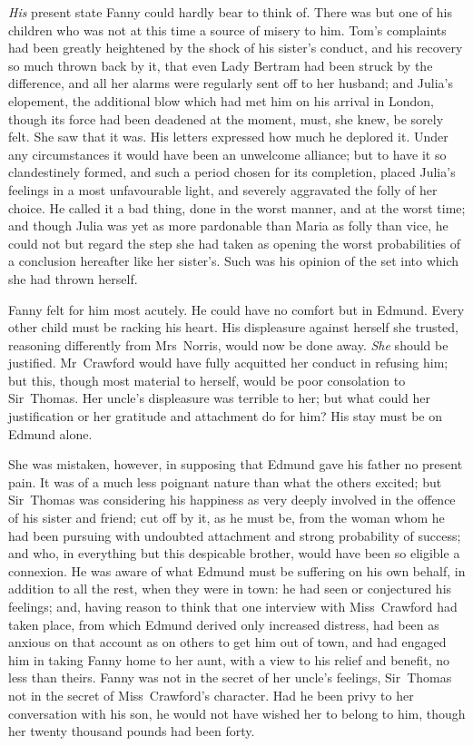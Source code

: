 \textit{His}  present state Fanny could hardly bear to think of. There was but one of his children who was not at this time a source of misery to him. Tom's complaints had been greatly heightened by the shock of his sister's conduct, and his recovery so much thrown back by it, that even Lady Bertram had been struck by the difference, and all her alarms were regularly sent off to her husband; and Julia's elopement, the additional blow which had met him on his arrival in London, though its force had been deadened at the moment, must, she knew, be sorely felt. She saw that it was. His letters expressed how much he deplored it. Under any circumstances it would have been an unwelcome alliance; but to have it so clandestinely formed, and such a period chosen for its completion, placed Julia's feelings in a most unfavourable light, and severely aggravated the folly of her choice. He called it a bad thing, done in the worst manner, and at the worst time; and though Julia was yet as more pardonable than Maria as folly than vice, he could not but regard the step she had taken as opening the worst probabilities of a conclusion hereafter like her sister's. Such was his opinion of the set into which she had thrown herself.

Fanny felt for him most acutely. He could have no comfort but in Edmund. Every other child must be racking his heart. His displeasure against herself she trusted, reasoning differently from Mrs~Norris, would now be done away. \textit{She}  should be justified. Mr~Crawford would have fully acquitted her conduct in refusing him; but this, though most material to herself, would be poor consolation to Sir~Thomas. Her uncle's displeasure was terrible to her; but what could her justification or her gratitude and attachment do for him? His stay must be on Edmund alone.

She was mistaken, however, in supposing that Edmund gave his father no present pain. It was of a much less poignant nature than what the others excited; but Sir~Thomas was considering his happiness as very deeply involved in the offence of his sister and friend; cut off by it, as he must be, from the woman whom he had been pursuing with undoubted attachment and strong probability of success; and who, in everything but this despicable brother, would have been so eligible a connexion. He was aware of what Edmund must be suffering on his own behalf, in addition to all the rest, when they were in town: he had seen or conjectured his feelings; and, having reason to think that one interview with Miss~Crawford had taken place, from which Edmund derived only increased distress, had been as anxious on that account as on others to get him out of town, and had engaged him in taking Fanny home to her aunt, with a view to his relief and benefit, no less than theirs. Fanny was not in the secret of her uncle's feelings, Sir~Thomas not in the secret of Miss~Crawford's character. Had he been privy to her conversation with his son, he would not have wished her to belong to him, though her twenty thousand pounds had been forty.

